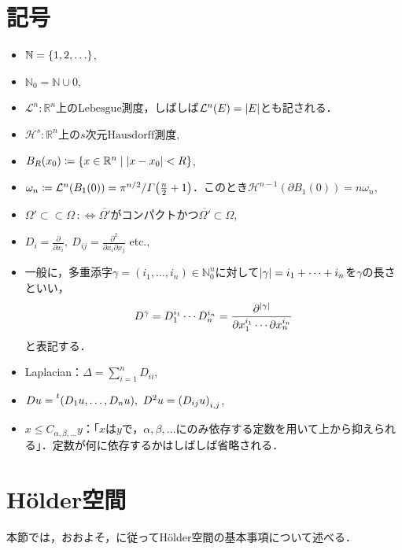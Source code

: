 \documentclass[a4paper]{ltjsarticle}
\newcommand{\Rset}{\mathbb{R}}
\newcommand{\Nset}{\mathbb{N}}
\newcommand{\transpose}[1]{\prescript{t}{}{#1}}
\newcommand{\ssubset}{\subset\subset}
\newcommand{\Lm}{\mathcal{L}}
\newcommand{\Hm}{\mathcal{H}}
\newcommand{\1}{\mathbbm{1}}
\numberwithin{equation}{section}
\theoremstyle{definition}
\begin{document}
\section*{記号}
\begin{itemize}
    \item $\Nset=\qty{1,2,\ldots}$,
    \item $\Nset_{0}=\Nset\cup\qty{0}$,
    \item $\Lm^n \colon \text{$\Rset^n$上のLebesgue測度}$，しばしば$\Lm^n(E)=\abs{E}$とも記される．    
    \item $\Hm^s  \colon \text{$\Rset^n$上の$s$次元Hausdorff測度}$,
    \item $B_R(x_0)\coloneqq \qty{x\in\Rset^n\mid \abs{x-x_0}<R}$,
    \item $\omega_n\coloneqq \Lm^n(B_1(0))=\pi^{n/2}/\varGamma\qty(\frac{n}{2}+1)$．このとき$\Hm^{n-1}(\partial B_1(0))=n\omega_n$,
    \item $\Omega'\ssubset\Omega \,:\Longleftrightarrow \overline{\Omega'}$がコンパクトかつ$\overline{\Omega'}\subset \Omega$,
    \item $D_i=\frac{\partial}{\partial x_i},\ D_{ij}=\frac{\partial^2}{\partial x_i\partial x_j}$  etc.,
    \item 一般に，多重添字$\gamma=(i_1,\ldots,i_n)\in \Nset_0^n$に対して$\abs{\gamma}=i_1+\cdots+i_n$を$\gamma$の長さといい，
    \begin{equation}
        D^\gamma=D_1^{i_1}\cdots D_n^{i_n}=\frac{\partial^{\abs{\gamma}}}{\partial x_1^{i_1}\cdots \partial x_n^{i_n}}
    \end{equation}
    と表記する．
    \item Laplacian：$\Delta=\sum_{i=1}^n D_{ii}$,
    \item $Du=\transpose{(D_1u,\ldots,D_nu)},\ D^2u=\qty(D_{ij}u)_{i,j}$,
    \item $x\leq C_{\alpha,\beta,\ldots} y$：「$x$は$y$で，$\alpha,\beta,\ldots$にのみ依存する定数を用いて上から抑えられる」．定数が何に依存するかはしばしば省略される．
\end{itemize}
\newpage
\section{Hölder空間}
本節では，おおよそ\cite{mped}，\cite{gt}に従ってHölder空間の基本事項について述べる．
\end{document}
